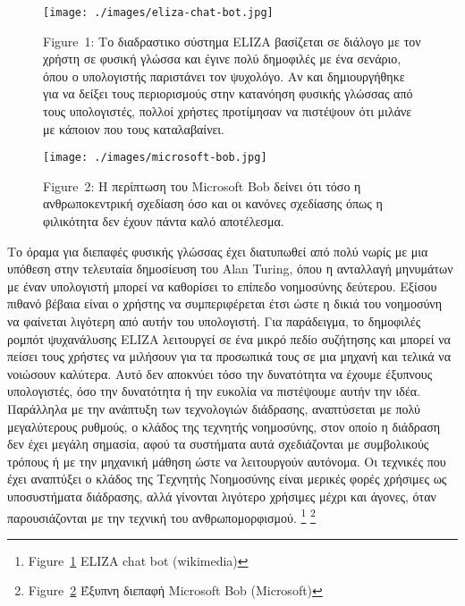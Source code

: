 \documentclass[
]{article}
\begin{document}
\leavevmode{}%
\begin{figure}
\hypertarget{fig:eliza-chat-bot}{%
\centering
\texttt{[image: ./images/eliza-chat-bot.jpg]}
\caption{Figure~1: Το διαδραστικο σύστημα ELIZA βασίζεται σε διάλογο με
τον χρήστη σε φυσική γλώσσα και έγινε πολύ δημοφιλές με ένα σενάριο,
όπου ο υπολογιστής παριστάνει τον ψυχολόγο. Αν και δημιουργήθηκε για να
δείξει τους περιορισμούς στην κατανόηση φυσικής γλώσσας από τους
υπολογιστές, πολλοί χρήστες προτίμησαν να πιστέψουν ότι μιλάνε με
κάποιον που τους καταλαβαίνει.}\label{fig:eliza-chat-bot}
}
\end{figure}

\leavevmode{}%
\begin{figure}
\hypertarget{fig:microsoft-bob}{%
\centering
\texttt{[image: ./images/microsoft-bob.jpg]}
\caption{Figure~2: Η περίπτωση του Microsoft Bob δείνει ότι τόσο η
ανθρωποκεντρική σχεδίαση όσο και οι κανόνες σχεδίασης όπως η φιλικότητα
δεν έχουν πάντα καλό αποτέλεσμα.}\label{fig:microsoft-bob}
}
\end{figure}

Το όραμα για διεπαφές φυσικής γλώσσας έχει διατυπωθεί από πολύ νωρίς με
μια υπόθεση στην τελευταία δημοσίευση του Alan Turing, όπου η ανταλλαγή
μηνυμάτων με έναν υπολογιστή μπορεί να καθορίσει το επίπεδο νοημοσύνης
δεύτερου. Εξίσου πιθανό βέβαια είναι ο χρήστης να συμπεριφέρεται έτσι
ώστε η δικιά του νοημοσύνη να φαίνεται λιγότερη από αυτήν του
υπολογιστή. Για παράδειγμα, το δημοφιλές ρομπότ ψυχανάλυσης ELIZA
λειτουργεί σε ένα μικρό πεδίο συζήτησης και μπορεί να πείσει τους
χρήστες να μιλήσουν για τα προσωπικά τους σε μια μηχανή και τελικά να
νοιώσουν καλύτερα. Αυτό δεν αποκνύει τόσο την δυνατότητα να έχουμε
έξυπνους υπολογιστές, όσο την δυνατότητα ή την ευκολία να πιστέψουμε
αυτήν την ιδέα. Παράλληλα με την ανάπτυξη των τεχνολογιών διάδρασης,
αναπτύσεται με πολύ μεγαλύτερους ρυθμούς, ο κλάδος της τεχνητής
νοημοσύνης, στον οποίο η διάδραση δεν έχει μεγάλη σημασία, αφού τα
συστήματα αυτά σχεδιάζονται με συμβολικούς τρόπους ή με την μηχανική
μάθηση ώστε να λειτουργούν αυτόνομα. Οι τεχνικές που έχει αναπτύξει ο
κλάδος της Τεχνητής Νοημοσύνης είναι μερικές φορές χρήσιμες ως
υποσυστήματα διάδρασης, αλλά γίνονται λιγότερο χρήσιμες μέχρι και
άγονες, όταν παρουσιάζονται με την τεχνική του ανθρωπομορφισμού.
\footnote{Figure~\protect\hyperlink{fig:eliza-chat-bot}{1} ELIZA chat
  bot (wikimedia)} \footnote{Figure~\protect\hyperlink{fig:microsoft-bob}{2}
  Έξυπνη διεπαφή Microsoft Bob (Microsoft)}
\end{document}
